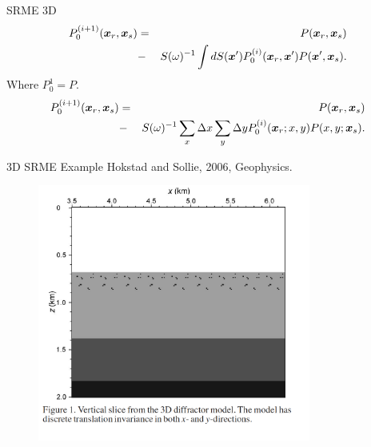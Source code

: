 \documentclass[xcolor=dvipsnames,notes]{beamer}
\begin{document}
\begin{frame}{SRME 3D}
\begin{eqnarray}
P^{(i+1)}_0(\mbox{\boldmath $x$}_r,\mbox{\boldmath $x$}_s) & = & P(\mbox{\boldmath $x$}_r,\mbox{\boldmath $x$}_s) \nonumber\\
    & - & S(\omega)^{-1} \int dS(\mbox{\boldmath $x$}') 
         P^{(i)}_0(\mbox{\boldmath $x$}_r,\mbox{\boldmath $x$}')P(\mbox{\boldmath $x$}',\mbox{\boldmath $x$}_s).  
\end{eqnarray}
Where $P^{1}_0=P$.
\begin{eqnarray*}
P^{(i+1)}_0(\mbox{\boldmath $x$}_r,\mbox{\boldmath $x$}_s) & = & P(\mbox{\boldmath $x$}_r,\mbox{\boldmath $x$}_s) \\
    & - & S(\omega)^{-1} \sum_{x}\Delta x \sum_{y}\Delta y 
         P^{(i)}_0(\mbox{\boldmath $x$}_r;x,y)P(x,y;\mbox{\boldmath $x$}_s).  
\end{eqnarray*}
\end{frame}
\begin{frame}{3D SRME Example}
Hokstad and Sollie, 2006, Geophysics.
\begin{figure}
\includegraphics[width=0.8\textwidth]{Fig/fig1.png}
\end{figure}
\end{frame}
\end{document}
